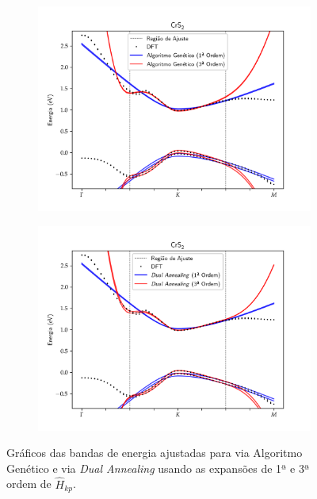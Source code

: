 \begin{figure}[p]
  \centering
  \begin{subfigure}{\textwidth}
    \includegraphics[trim=0 0.6cm 0 0.6cm,clip,width=\textwidth]{imagens/crs2_genetic_algorithm_order_13.png}
    \caption{}
    \label{fig:crs2_genetic_algorithm}
  \end{subfigure}
  \begin{subfigure}{\textwidth}
    \includegraphics[trim=0 0.6cm 0 0.6cm,clip,width=\textwidth]{imagens/crs2_dual_annealing_order_13.png}
    \caption{}
    \label{fig:crs2_dual_annealing}
  \end{subfigure}
  \caption{
    Gráficos das bandas de energia ajustadas para  via Algoritmo Genético
     e via \textit{Dual Annealing} 
    usando as expansões de 1ª e 3ª ordem de $ \hat{H}_{kp} $.
  }
  \label{fig:crs2}
\end{figure}

